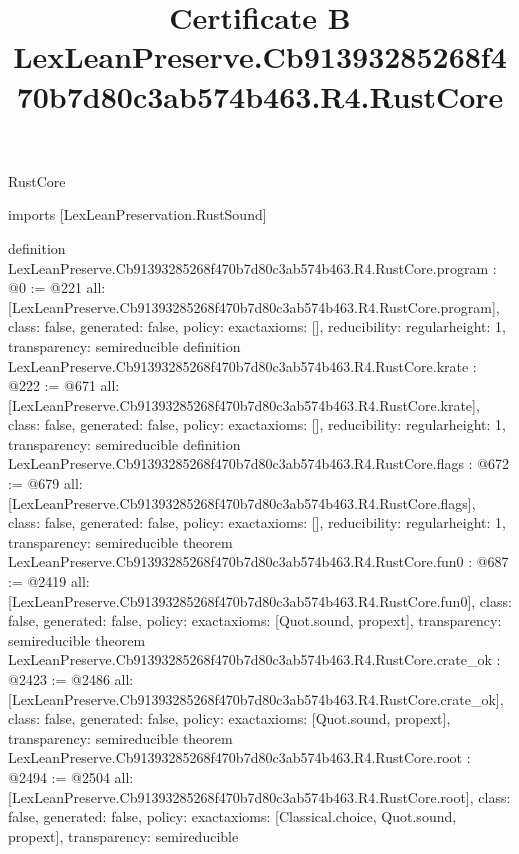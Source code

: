 \begin{lexlean}{RustCore}
\title{Certificate B LexLeanPreserve.Cb91393285268f470b7d80c3ab574b463.R4.RustCore}
\begin{coremodule}
imports [LexLeanPreservation.RustSound]

definition LexLeanPreserve.Cb91393285268f470b7d80c3ab574b463.R4.RustCore.program : @0 := @221 {
  all: [LexLeanPreserve.Cb91393285268f470b7d80c3ab574b463.R4.RustCore.program],
  class: false,
  generated: false,
  policy: exact{axioms: []},
  reducibility: regular{height: 1},
  transparency: semireducible
}
definition LexLeanPreserve.Cb91393285268f470b7d80c3ab574b463.R4.RustCore.krate : @222 := @671 {
  all: [LexLeanPreserve.Cb91393285268f470b7d80c3ab574b463.R4.RustCore.krate],
  class: false,
  generated: false,
  policy: exact{axioms: []},
  reducibility: regular{height: 1},
  transparency: semireducible
}
definition LexLeanPreserve.Cb91393285268f470b7d80c3ab574b463.R4.RustCore.flags : @672 := @679 {
  all: [LexLeanPreserve.Cb91393285268f470b7d80c3ab574b463.R4.RustCore.flags],
  class: false,
  generated: false,
  policy: exact{axioms: []},
  reducibility: regular{height: 1},
  transparency: semireducible
}
theorem LexLeanPreserve.Cb91393285268f470b7d80c3ab574b463.R4.RustCore.fun0 : @687 := @2419 {
  all: [LexLeanPreserve.Cb91393285268f470b7d80c3ab574b463.R4.RustCore.fun0],
  class: false,
  generated: false,
  policy: exact{axioms: [Quot.sound, propext]},
  transparency: semireducible
}
theorem LexLeanPreserve.Cb91393285268f470b7d80c3ab574b463.R4.RustCore.crate_ok : @2423 := @2486 {
  all: [LexLeanPreserve.Cb91393285268f470b7d80c3ab574b463.R4.RustCore.crate_ok],
  class: false,
  generated: false,
  policy: exact{axioms: [Quot.sound, propext]},
  transparency: semireducible
}
theorem LexLeanPreserve.Cb91393285268f470b7d80c3ab574b463.R4.RustCore.root : @2494 := @2504 {
  all: [LexLeanPreserve.Cb91393285268f470b7d80c3ab574b463.R4.RustCore.root],
  class: false,
  generated: false,
  policy: exact{axioms: [Classical.choice, Quot.sound, propext]},
  transparency: semireducible
}


\end{coremodule}
\end{lexlean}

